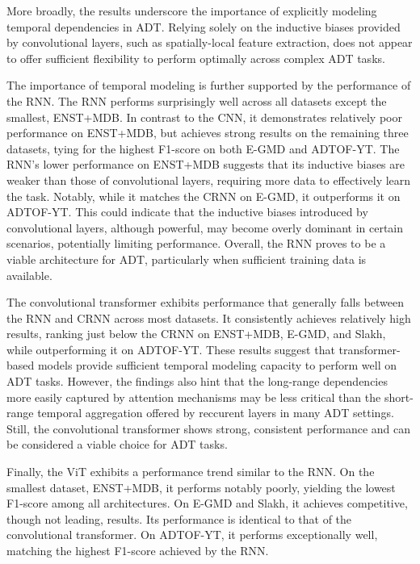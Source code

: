 More broadly, the results underscore the importance of explicitly modeling temporal dependencies in \gls{ADT}. Relying solely on the inductive biases provided by convolutional layers, such as spatially-local feature extraction, does not appear to offer sufficient flexibility to perform optimally across complex \gls{ADT} tasks.

The importance of temporal modeling is further supported by the performance of the \acrlong{RNN}. The \gls{RNN} performs surprisingly well across all datasets except the smallest, ENST+MDB. In contrast to the \gls{CNN}, it demonstrates relatively poor performance on ENST+MDB, but achieves strong results on the remaining three datasets, tying for the highest F1-score on both E-GMD and ADTOF-YT. The \gls{RNN}'s lower performance on ENST+MDB suggests that its inductive biases are weaker than those of convolutional layers, requiring more data to effectively learn the task. Notably, while it matches the \gls{CRNN} on E-GMD, it outperforms it on ADTOF-YT. This could indicate that the inductive biases introduced by convolutional layers, although powerful, may become overly dominant in certain scenarios, potentially limiting performance. Overall, the \gls{RNN} proves to be a viable architecture for \gls{ADT}, particularly when sufficient training data is available.

The convolutional transformer exhibits performance that generally falls between the \gls{RNN} and \gls{CRNN} across most datasets. It consistently achieves relatively high results, ranking just below the \gls{CRNN} on ENST+MDB, E-GMD, and Slakh, while outperforming it on ADTOF-YT. These results suggest that transformer-based models provide sufficient temporal modeling capacity to perform well on \gls{ADT} tasks. However, the findings also hint that the long-range dependencies more easily captured by attention mechanisms may be less critical than the short-range temporal aggregation offered by reccurent layers in many \gls{ADT} settings. Still, the convolutional transformer shows strong, consistent performance and can be considered a viable choice for \gls{ADT} tasks.

Finally, the \acrfull{ViT} exhibits a performance trend similar to the \gls{RNN}. On the smallest dataset, ENST+MDB, it performs notably poorly, yielding the lowest F1-score among all architectures. On E-GMD and Slakh, it achieves competitive, though not leading, results. Its performance is identical to that of the convolutional transformer. On ADTOF-YT, it performs exceptionally well, matching the highest F1-score achieved by the \gls{RNN}. 

